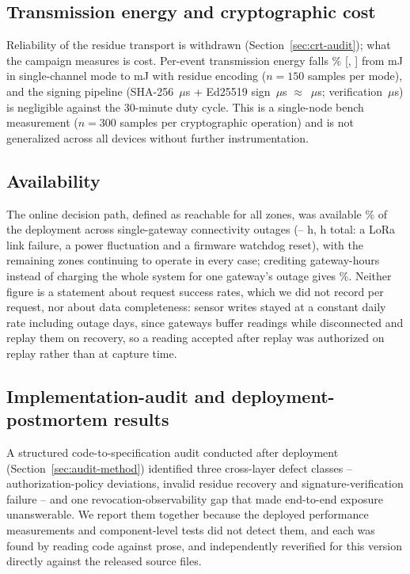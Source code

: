 \subsection{Transmission energy and cryptographic cost}
\label{sec:energy-results}

Reliability of the residue transport is withdrawn (Section~\ref{sec:crt-audit}); what the campaign measures is cost. Per-event transmission energy falls \EnergyReductionPct\% [\EnergyReductionCILow, \EnergyReductionCIHigh] from \EnergySingleChannelMj{} mJ in single-channel mode to \EnergyCrtMj{} mJ with residue encoding ($n=150$ samples per mode), and the signing pipeline (SHA-256 \ShaTwoFiveSixMeanUs\,$\mu$s + Ed25519 sign \SignMeanUs\,$\mu$s $\approx$ \SignPipelineUs\,$\mu$s; verification \VerifyMeanUs\,$\mu$s) is negligible against the 30-minute duty cycle. This is a single-node bench measurement ($n=300$ samples per cryptographic operation) and is not generalized across all \Sensors{} devices without further instrumentation.

\subsection{Availability}
\label{sec:availability}

The online decision path, defined as reachable for all zones, was available \DecisionPathUptime\% of the deployment across \OutageCount{} single-gateway connectivity outages (\OutageMinHours--\OutageMaxHours{} h, \OutageTotalHours{} h total: a LoRa link failure, a power fluctuation and a firmware watchdog reset), with the remaining zones continuing to operate in every case; crediting gateway-hours instead of charging the whole system for one gateway's outage gives \GatewayHourUptime\%. Neither figure is a statement about request success rates, which we did not record per request, nor about data completeness: sensor writes stayed at a constant daily rate including outage days, since gateways buffer readings while disconnected and replay them on recovery, so a reading accepted after replay was authorized on replay rather than at capture time.

\subsection{Implementation-audit and deployment-postmortem results}
\label{sec:audit}

A structured code-to-specification audit conducted after deployment (Section~\ref{sec:audit-method}) identified three cross-layer defect classes -- authorization-policy deviations, invalid residue recovery and signature-verification failure -- and one revocation-observability gap that made end-to-end exposure unanswerable. We report them together because the deployed performance measurements and component-level tests did not detect them, and each was found by reading code against prose, and independently reverified for this version directly against the released source files.

